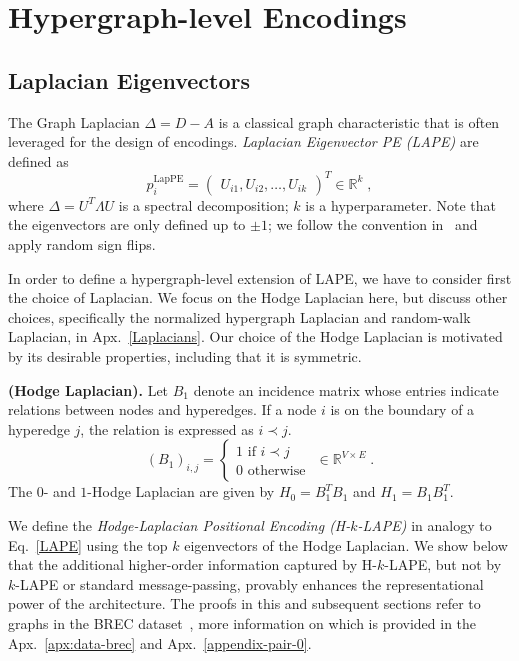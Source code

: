 \section{Hypergraph-level Encodings}
\label{theory}

\subsection{Laplacian Eigenvectors}
The Graph Laplacian $\Delta=D-A$ is a classical graph characteristic that is often leveraged for the design of encodings. \emph{Laplacian Eigenvector PE (LAPE)} 
are defined as 
\begin{equation}
\label{LAPE}
    p_i^{\text{LapPE}} = \begin{pmatrix} U_{i1}, U_{i2}, \hdots, U_{ik}
\end{pmatrix}^T 
\in \mathbb{R}^k \; ,
\end{equation}
where $\Delta=U^T \Lambda U$ is a spectral decomposition; $k$ is a hyperparameter.
Note that the eigenvectors are only defined up to $\pm 1$; we follow the convention in~\citep{dwivedi2021graph} and apply random sign flips. 


In order to define a hypergraph-level extension of LAPE, we have to consider first the choice of Laplacian. 
We focus on the Hodge Laplacian here, but discuss other choices, specifically the normalized hypergraph Laplacian and random-walk Laplacian, in Apx.~\ref{Laplacians}. Our choice of the Hodge Laplacian is motivated by its desirable properties, including that it is symmetric.\\

\begin{defn}\label{def:hodge-lape} \textbf{(Hodge Laplacian).} 
Let $B_1$ denote an incidence matrix whose entries indicate relations between nodes and hyperedges. If a node $i$ is on the boundary of a hyperedge $j$, the relation is expressed as $i \prec j$.
\begin{equation} \label{incidence_matrix} (B_1)_{i,j} = \begin{cases}  1 \text{ if } i \prec j \\ 0 \text{ otherwise } \end{cases} \in \mathbb{R}^{V\times E} \; .
\end{equation}
\noindent The $0$- and $1$-Hodge Laplacian are given by 
$H_0 = B_1^TB_1$ and $H_1 = B_1B_1^T$.
\end{defn}

We define the \textit{Hodge-Laplacian Positional Encoding (H-$k$-LAPE)} in analogy to Eq.~\ref{LAPE} using the top $k$ eigenvectors of the Hodge 
Laplacian. 
We show below that the additional higher-order information captured by H-$k$-LAPE, but not by $k$-LAPE or standard message-passing, provably enhances the representational power of the architecture. 
The proofs in this and subsequent sections refer to graphs in the BREC dataset~\citep{wang2023towards}, more information on which is provided in the Apx.~\ref{apx:data-brec} and Apx.~\ref{appendix-pair-0}.\\

